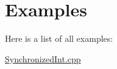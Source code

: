 \section{Examples}
Here is a list of all examples\+:\begin{DoxyCompactItemize}
\item 
\hyperlink{_synchronized_int_8cpp-example}{Synchronized\+Int.\+cpp}
\end{DoxyCompactItemize}
